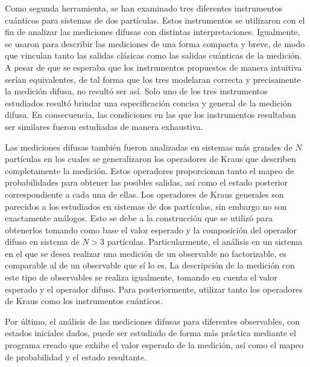 Como segunda herramienta, se han examinado tres diferentes instrumentos
cuánticos para sistemas de dos partículas. Estos instrumentos se utilizaron con
el fin de analizar las mediciones difusas con distintas interpretaciones.
Igualmente, se usaron para describir las mediciones de una forma compacta y
breve, de modo que vinculan tanto las salidas clásicas como las salidas
cuánticas de la medición. A pesar de que se esperaba que los instrumentos
propuestos de manera intuitiva serían equivalentes, de tal forma que los tres
modelaran correcta y precisamente la medición difusa, no resultó ser así. Solo
uno de los tres instrumentos estudiados resultó brindar una especificación
concisa y general de la medición difusa. En consecuencia, las condiciones en
las que los instrumentos resultaban ser similares fueron estudiadas de manera
exhaustiva. 


Las mediciones difusas también fueron analizadas en sistemas más grandes de $N$
partículas en los cuales se generalizaron los operadores de Kraus que describen
completamente la medición. Estos operadores proporcionan tanto el mapeo de
probabilidades para obtener las posibles salidas, así como el estado posterior
correspondiente a cada una de ellas. Los operadores de Kraus generales son
parecidos a los estudiados en sistemas de dos partículas, sin embargo no son
exactamente análogos. Esto se debe a la construcción que se utilizó para
obtenerlos tomando como base el valor esperado y la composición del operador
difuso en sistema de $N>3$ partículas. Particularmente, el análisis en un
sistema en el que se desea realizar una medición de un observable no
factorizable, es comparable al de un observable que sí lo es. La descripción de
la medición con este tipo de observables se realiza igualmente, tomando en
cuenta el valor esperado y el operador difuso. Para posteriormente, utilizar
tanto los operadores de Kraus como los instrumentos cuánticos.


Por último, el análisis de las mediciones difusas para diferentes observables,
con estados iniciales dados, puede ser estudiado de forma más práctica mediante
el programa creado que exhibe el valor esperado de la medición, así como el
mapeo de probabilidad y el estado resultante.

